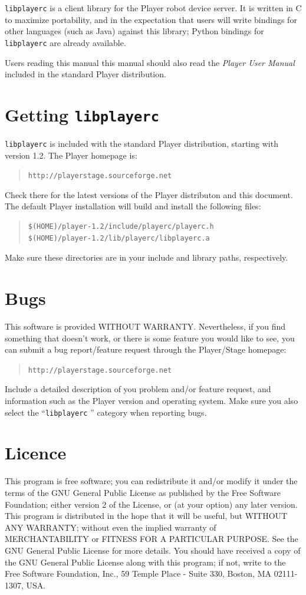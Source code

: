 \documentclass[11pt]{report}
\def\HOMEPAGE {{\tt http://playerstage.sourceforge.net}}
\def\libplayerc {{\tt libplayerc} }
\begin{document}
\libplayerc is a client library for the Player robot device server.
It is written in C to maximize portability, and in the expectation
that users will write bindings for other languages (such as Java)
against this library; Python bindings for \libplayerc are already
available.

Users reading this manual this manual should also read the {\em Player
User Manual} included in the standard Player distribution.


\section{Getting \libplayerc}

\libplayerc is included with the standard Player distribution, starting with
version 1.2.  The Player homepage is:
\begin{quote}
\HOMEPAGE
\end{quote}
Check there for the latest versions of the Player distributon and this
document.  The default Player installation will build and install the
following files:
\begin{quote}
\begin{verbatim}
$(HOME)/player-1.2/include/playerc/playerc.h
$(HOME)/player-1.2/lib/playerc/libplayerc.a
\end{verbatim}
\end{quote}
Make sure these directories are in your include and library paths,
respectively.


\section{Bugs}

This software is provided WITHOUT WARRANTY.  Nevertheless, if you find
something that doesn't work, or there is some feature you would like
to see, you can submit a bug report/feature request through the
Player/Stage homepage:
\begin{quote} 
\HOMEPAGE
\end{quote}
Include a detailed description of you problem and/or feature request,
and information such as the Player version and operating system.  Make
sure you also select the ``\libplayerc'' category when reporting bugs.


\section{Licence}

This program is free software; you can redistribute it and/or modify
it under the terms of the GNU General Public License as published by
the Free Software Foundation; either version 2 of the License, or (at
your option) any later version.  This program is distributed in the
hope that it will be useful, but WITHOUT ANY WARRANTY; without even
the implied warranty of MERCHANTABILITY or FITNESS FOR A PARTICULAR
PURPOSE.  See the GNU General Public License for more details.  You
should have received a copy of the GNU General Public License along
with this program; if not, write to the Free Software Foundation,
Inc., 59 Temple Place - Suite 330, Boston, MA 02111-1307, USA.
\end{document}
